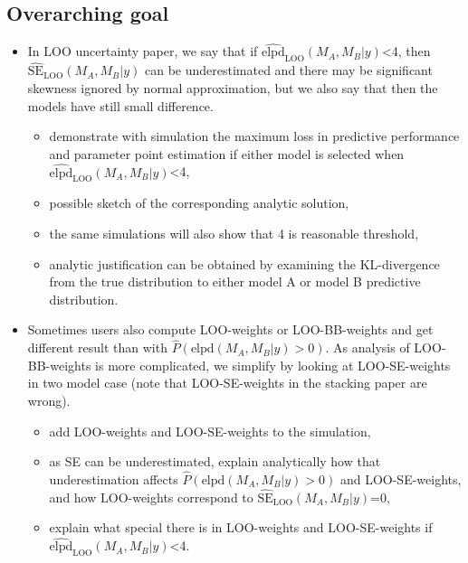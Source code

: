 \hypertarget{overarching-goal}{%
\subsection{Overarching goal}\label{overarching-goal}}

\begin{itemize}
\tightlist
\item
  In LOO uncertainty paper, we say that if
  \textbar{}\(\widehat{\mathrm{elpd}}_\mathrm{LOO}(M_A, M_B | y)\)\textbar{}\textless{}4,
  then \(\widehat{\mathrm{SE}}_\mathrm{LOO}(M_A, M_B | y)\) can be
  underestimated and there may be significant skewness ignored by normal
  approximation, but we also say that then the models have still small
  difference.

  \begin{itemize}
  \tightlist
  \item
    demonstrate with simulation the maximum loss in predictive
    performance and parameter point estimation if either model is
    selected when
    \textbar{}\(\widehat{\mathrm{elpd}}_\mathrm{LOO}(M_A, M_B | y)\)\textbar{}\textless{}4,
  \item
    possible sketch of the corresponding analytic solution,
  \item
    the same simulations will also show that 4 is reasonable threshold,
  \item
    analytic justification can be obtained by examining the
    KL-divergence from the true distribution to either model A or model
    B predictive distribution.
  \end{itemize}
\item
  Sometimes users also compute LOO-weights or LOO-BB-weights and get
  different result than with
  \(\widehat{P}(\mathrm{elpd}(M_A, M_B | y) > 0)\). As analysis of
  LOO-BB-weights is more complicated, we simplify by looking at
  LOO-SE-weights in two model case (note that LOO-SE-weights in the
  stacking paper are wrong).

  \begin{itemize}
  \tightlist
  \item
    add LOO-weights and LOO-SE-weights to the simulation,
  \item
    as SE can be underestimated, explain analytically how that
    underestimation affects
    \(\widehat{P}(\mathrm{elpd}(M_A, M_B | y) > 0)\) and LOO-SE-weights,
    and how LOO-weights correspond to
    \(\widehat{\mathrm{SE}}_\mathrm{LOO}(M_A, M_B | y)\)=0,
  \item
    explain what special there is in LOO-weights and LOO-SE-weights if
    \textbar{}\(\widehat{\mathrm{elpd}}_\mathrm{LOO}(M_A, M_B | y)\)\textbar{}\textless{}4.
  \end{itemize}
\end{itemize}

